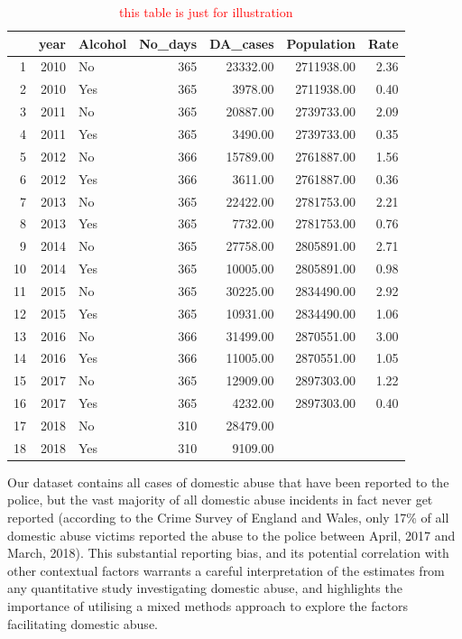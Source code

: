 \documentclass[12pt, letterpaper]{article}
\begin{document}
\begin{table}[ht]
\centering
\caption{\textcolor{red}{this table is just for illustration}}
\begin{tabular}{rrlrrrr}
  \hline
 & year & Alcohol & No\_days & DA\_cases & Population & Rate \\ 
  \hline
1 & 2010 & No & 365 & 23332.00 & 2711938.00 & 2.36 \\ 
  2 & 2010 & Yes & 365 & 3978.00 & 2711938.00 & 0.40 \\ 
  3 & 2011 & No & 365 & 20887.00 & 2739733.00 & 2.09 \\ 
  4 & 2011 & Yes & 365 & 3490.00 & 2739733.00 & 0.35 \\ 
  5 & 2012 & No & 366 & 15789.00 & 2761887.00 & 1.56 \\ 
  6 & 2012 & Yes & 366 & 3611.00 & 2761887.00 & 0.36 \\ 
  7 & 2013 & No & 365 & 22422.00 & 2781753.00 & 2.21 \\ 
  8 & 2013 & Yes & 365 & 7732.00 & 2781753.00 & 0.76 \\ 
  9 & 2014 & No & 365 & 27758.00 & 2805891.00 & 2.71 \\ 
  10 & 2014 & Yes & 365 & 10005.00 & 2805891.00 & 0.98 \\ 
  11 & 2015 & No & 365 & 30225.00 & 2834490.00 & 2.92 \\ 
  12 & 2015 & Yes & 365 & 10931.00 & 2834490.00 & 1.06 \\ 
  13 & 2016 & No & 366 & 31499.00 & 2870551.00 & 3.00 \\ 
  14 & 2016 & Yes & 366 & 11005.00 & 2870551.00 & 1.05 \\ 
  15 & 2017 & No & 365 & 12909.00 & 2897303.00 & 1.22 \\ 
  16 & 2017 & Yes & 365 & 4232.00 & 2897303.00 & 0.40 \\ 
  17 & 2018 & No & 310 & 28479.00 &  &  \\ 
  18 & 2018 & Yes & 310 & 9109.00 &  &  \\ 
   \hline
\end{tabular}
\end{table}

Our dataset contains all cases of domestic abuse that have been reported to the police, but the vast majority of all domestic abuse incidents in fact never get reported (according to the Crime Survey of England and Wales, only 17\% of all domestic abuse victims reported the abuse to the police between April, 2017 and March, 2018\autocite{ONS}). This substantial reporting bias, and its potential correlation with other contextual factors warrants a careful interpretation of the estimates from any quantitative study investigating domestic abuse, and highlights the importance of utilising a mixed methods approach to explore the factors facilitating domestic abuse. 
\end{document}
